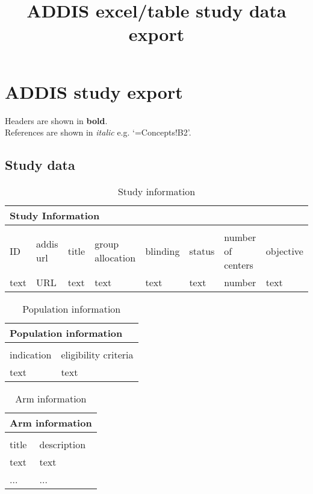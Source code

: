 \documentclass[a4paper,10pt]{article}
\title{ADDIS excel/table study data export}
\begin{document}
\maketitle
\section*{ADDIS study export}

Headers are shown in \textbf{bold}.\\
References are shown in \textit{italic} e.g. `=Concepts!B2'.
\subsection*{Study data}

\begin{table}[]
  \caption{Study information}
  \begin{tabular}{|l|l|l|l|l|l|l|l|}
    \hline
    \multicolumn{8}{|l|}{Study Information} \\ \hline
    \multicolumn{8}{|l|}{}                  \\ \hline
    ID & addis url & title & group allocation & blinding & status & number of centers & objective \\ \hline
    text & URL & text & text & text & text & number & text \\ \hline
  \end{tabular}
\end{table}

\begin{table}[]
  \caption{Population information}
  \begin{tabular}{|l|l|}
    \hline
    \multicolumn{2}{|l|}{Population information}  \\ \hline
    \multicolumn{2}{|l|}{}                        \\ \hline
    indication & eligibility criteria             \\ \hline
    text & text                                   \\ \hline
  \end{tabular}
\end{table}

\begin{table}[]
  \caption{Arm information}
  \begin{tabular}{|l|l|}
    \hline
    \multicolumn{2}{|l|}{Arm information}  \\ \hline
    \multicolumn{2}{|l|}{}                 \\ \hline
    title & description                    \\ \hline
    text & text                            \\ \hline
    ... & ...                            \\ \hline
  \end{tabular}
\end{table}
\end{document}
